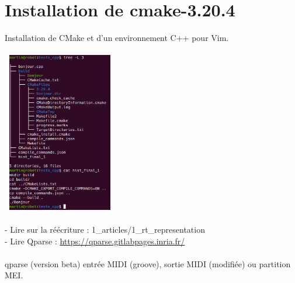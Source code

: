 \section*{Installation de cmake-3.20.4}
Installation de CMake et d’un environnement C++ pour Vim.\\\\
\includegraphics[height=70mm, width=50mm]{images/cpp_env_0.png}\\\\
- Lire sur la réécriture : 1\_articles/1\_rt\_representation\\
- Lire Qparse : \url{https://qparse.gitlabpages.inria.fr/}\\\\
qparse (version beta) entrée MIDI (groove), sortie MIDI (modifiée) ou
partition MEI.